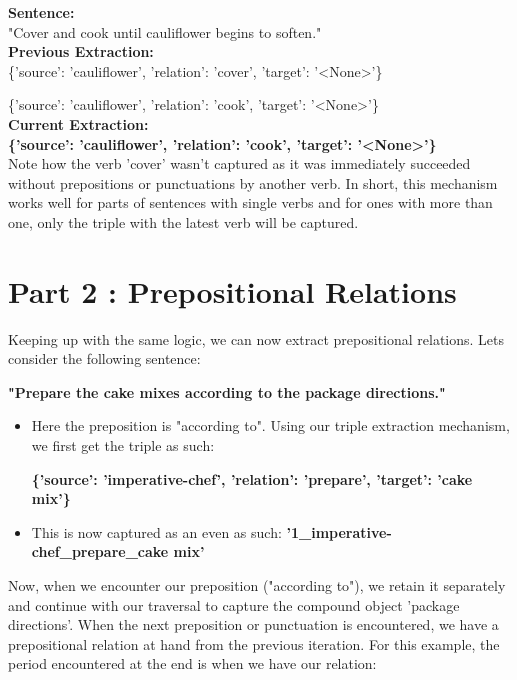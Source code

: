 \documentclass[11pt,letterpaper]{article}
\begin{document}
\textbf{Sentence:}\\

"Cover and cook until cauliflower begins to soften."\\

\textbf{Previous Extraction:}\\

\{'source': 'cauliflower', 'relation': 'cover', 'target': '<None>'\}

\{'source': 'cauliflower', 'relation': 'cook', 'target': '<None>'\}\\

\textbf{Current Extraction:}\\

\textbf{\{'source': 'cauliflower', 'relation': 'cook', 'target': '<None>'\}}\\

Note how the verb 'cover' wasn't captured as it was immediately succeeded without prepositions or punctuations by another verb. In short, this mechanism works well for parts of sentences with single verbs and for ones with more than one, only the triple with the latest verb will be captured.\\

\section{Part 2 : Prepositional Relations}

Keeping up with the same logic, we can now extract prepositional relations. Lets consider the following sentence:

\textbf{"Prepare the cake mixes according to the package directions."}

\begin{itemize}
    \item Here the preposition is "according to". Using our triple extraction mechanism, we first get the triple as such:
    
    \textbf{\{'source': 'imperative-chef', 'relation': 'prepare', 'target': 'cake mix'\}}
    
    \item This is now captured as an even as such: \textbf{'1\_imperative-chef\_prepare\_cake mix'}\\
    
\end{itemize}

Now, when we encounter our preposition ("according to"), we retain it separately and continue with our traversal to capture the compound object 'package directions'. When the next preposition or punctuation is encountered, we have a prepositional relation at hand from the previous iteration. For this example, the period encountered at the end is when we have our relation:\\
\end{document}
